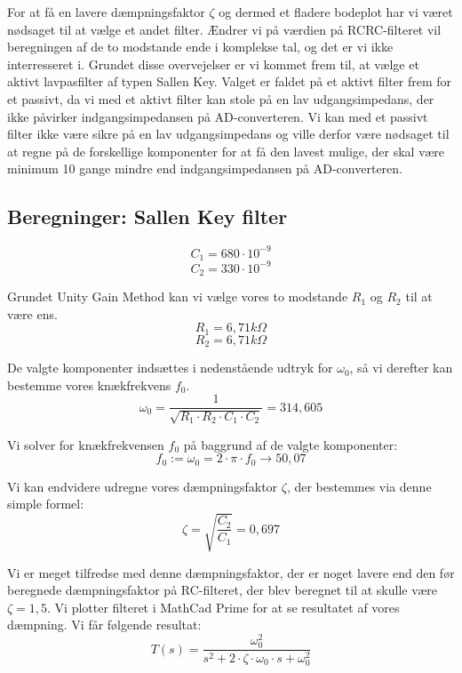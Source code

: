 \clearpage

For at få en lavere dæmpningsfaktor $ \zeta $ og dermed et fladere bodeplot har vi været nødsaget til at vælge et andet filter. Ændrer vi på værdien på RCRC-filteret vil beregningen af de to modstande ende i komplekse tal, og det er vi ikke interresseret i.  Grundet disse overvejelser er vi kommet frem til, at vælge et aktivt lavpasfilter af typen Sallen Key. Valget er faldet på et aktivt filter frem for et passivt, da vi med et aktivt filter kan stole på en lav udgangsimpedans, der ikke påvirker indgangsimpedansen på AD-converteren. Vi kan med et passivt filter ikke være sikre på en lav udgangsimpedans og ville derfor være nødsaget til at regne på de forskellige komponenter for at få den lavest mulige, der skal være minimum 10 gange mindre end indgangsimpedansen på AD-converteren.

\subsection{Beregninger: Sallen Key filter}
\vspace{0.5 cm}
\[ C_{1} = 680 \cdot 10^{-9} \]
\[ C_{2} = 330 \cdot 10^{-9} \]

Grundet Unity Gain Method kan vi vælge vores to modstande $ R_{1} $ og $ R_{2} $ til at være ens.
\[ R_{1} = 6,71 k\Omega \]
\[ R_{2} = 6,71 k\Omega \]

De valgte komponenter indsættes i nedenstående udtryk for $ \omega_{0} $, så vi derefter kan bestemme vores knækfrekvens $ f_{0} $.
\[ \omega_{0}=\frac{1}{\sqrt{R_{1} \cdot R_{2} \cdot C_{1} \cdot C_{2}}}=314,605 \]

Vi solver for knækfrekvensen $ f_{0} $ på baggrund af de valgte komponenter:
\[ f_{0}:=\omega_{0}=2\cdot \pi \cdot f_{0} \rightarrow 50,07 \]

Vi kan endvidere udregne vores dæmpningsfaktor $ \zeta $, der bestemmes via denne simple formel: 
\[ \zeta=\sqrt{\frac{C_{2}}{C_{1}}}=0,697 \]

Vi er meget tilfredse med denne dæmpningsfaktor, der er noget lavere end den før beregnede dæmpningsfaktor på RC-filteret, der blev beregnet til at skulle være $ \zeta = 1,5 $. Vi plotter filteret i MathCad Prime for at se resultatet af vores dæmpning. Vi får følgende resultat:
\[ T(s)=\frac{\omega_{0}^{2}}{{s^{2}+2 \cdot \zeta \cdot \omega_{0}\cdot s+\omega_{0}^{2}}} \]

\clearpage

